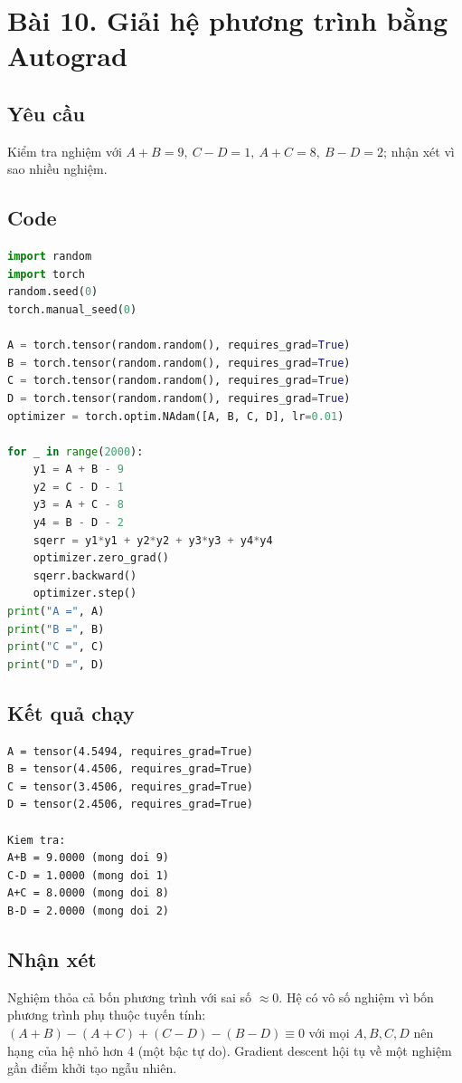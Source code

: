 \documentclass[a4paper,13pt]{article}
\begin{document}
\section{Bài 10. Giải hệ phương trình bằng Autograd}

\subsection{Yêu cầu}
Kiểm tra nghiệm với $A+B=9,\ C-D=1,\ A+C=8,\ B-D=2$; nhận xét vì sao nhiều nghiệm.

\subsection{Code}
\begin{lstlisting}[language=Python]
import random
import torch
random.seed(0)
torch.manual_seed(0)

A = torch.tensor(random.random(), requires_grad=True)
B = torch.tensor(random.random(), requires_grad=True)
C = torch.tensor(random.random(), requires_grad=True)
D = torch.tensor(random.random(), requires_grad=True)
optimizer = torch.optim.NAdam([A, B, C, D], lr=0.01)

for _ in range(2000):
    y1 = A + B - 9
    y2 = C - D - 1
    y3 = A + C - 8
    y4 = B - D - 2
    sqerr = y1*y1 + y2*y2 + y3*y3 + y4*y4
    optimizer.zero_grad()
    sqerr.backward()
    optimizer.step()
print("A =", A)
print("B =", B)
print("C =", C)
print("D =", D)
\end{lstlisting}

\subsection{Kết quả chạy}
\begin{lstlisting}[backgroundcolor=\color{outgray}]
A = tensor(4.5494, requires_grad=True)
B = tensor(4.4506, requires_grad=True)
C = tensor(3.4506, requires_grad=True)
D = tensor(2.4506, requires_grad=True)

Kiem tra:
A+B = 9.0000 (mong doi 9)
C-D = 1.0000 (mong doi 1)
A+C = 8.0000 (mong doi 8)
B-D = 2.0000 (mong doi 2)
\end{lstlisting}

\subsection{Nhận xét}
Nghiệm thỏa cả bốn phương trình với sai số $\approx 0$. Hệ có vô số nghiệm vì bốn phương trình phụ thuộc tuyến tính: $(A+B)-(A+C)+(C-D)-(B-D) \equiv 0$ với mọi $A,B,C,D$ nên hạng của hệ nhỏ hơn 4 (một bậc tự do). Gradient descent hội tụ về một nghiệm gần điểm khởi tạo ngẫu nhiên.
\end{document}
